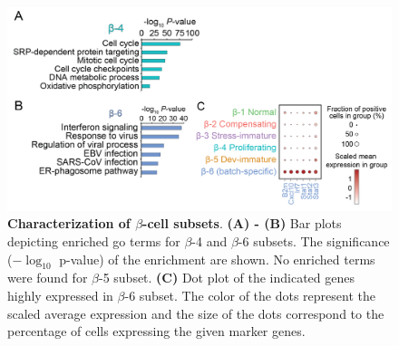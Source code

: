 \begin{figure}[H]
\centering
\vspace{110pt}
\includegraphics[width=\linewidth]{Appendix2/Fig/F3-1-v2-01.png}
\caption[Characterization of $\beta$-cell subsets]{\textbf{Characterization of $\beta$-cell subsets}. \textbf{(A) - (B)} Bar plots depicting enriched \gls{go} terms for $\beta$-4  and $\beta$-6 subsets. The significance ($-\log_{10}$ p-value) of the enrichment are shown. No enriched terms were found for $\beta$-5 subset. \textbf{(C)} Dot plot of the indicated genes highly expressed in $\beta$-6 subset. The color of the dots represent the scaled average expression and the size of the dots correspond to the percentage of cells expressing the given marker genes.}
\label{fig:app_chp3_betasubsets}
\end{figure}



